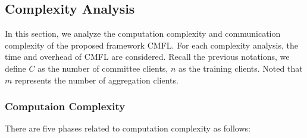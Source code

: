 \documentclass[10pt,journal,compsoc]{IEEEtran}
\begin{document}
\subsection{Complexity Analysis}
\label{ComplexityAnalysis}
In this section, we analyze the computation complexity and communication complexity of the proposed framework CMFL. For each complexity analysis, the time and overhead of CMFL are considered. {Recall the previous notations, we define $C$ as the number of committee clients, $n$ as the training clients.} Noted that $m$ represents the number of aggregation clients. 

\subsubsection{Computaion Complexity}

There are five phases related to computation complexity as follows:
\end{document}
